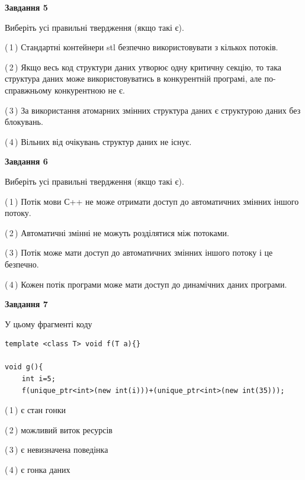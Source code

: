 \documentclass[12pt, ukrainian]{article}
\begin{document}
\begin {large}
{\begin{center}
\textbf{Завдання 5}
\end{center}

Виберіть усі правильні твердження (якщо такі є).\par
\vspace{2mm}

(\,1\,) Стандартні контейнери stl безпечно використовувати з кількох потоків.%

(\,2\,) Якщо весь код структури даних утворює одну критичну секцію, то така структура даних може використовуватись в конкурентній програмі, але по-справжньо\-му конкурентною не є.%

(\,3\,) За використання атомарних змінних структура даних є структурою даних без блокувань.%

(\,4\,) Вільних від очікувань структур даних не існує.%
\newpage


\begin{center}
\textbf{Завдання 6}
\end{center}

Виберіть усі правильні твердження (якщо такі є).\par
\vspace{2mm}

(\,1\,) Потік мови С++ не може отримати доступ до автоматичних змінних іншого потоку.%

(\,2\,) Автоматичні змінні не можуть розділятися між потоками.%

(\,3\,) Потік може мати доступ до автоматичних змінних іншого потоку і це безпечно.%

(\,4\,) Кожен потік програми може мати доступ до динамічних даних програми.%


\begin{center}
\textbf{Завдання 7}
\end{center}

У цьому фрагменті коду
\begin{verbatim}
template <class T> void f(T a){}

void g(){
    int i=5;
    f(unique_ptr<int>(new int(i)))+(unique_ptr<int>(new int(35)));
\end{verbatim}
(\,1\,) є стан гонки%

(\,2\,) можливий виток ресурсів%

(\,3\,) є невизначена поведінка%

(\,4\,) є гонка даних%

}
\end {large}

\vspace{4mm}
\newpage
\end{document}
